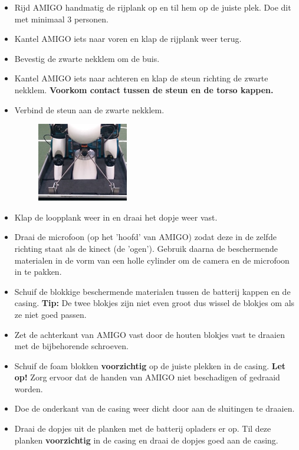\documentclass[a4paper,10pt]{article}
\numberwithin{equation}{section}
\numberwithin{figure}{section}
\numberwithin{table}{section}
\begin{document}
\begin{itemize}
\begin{itemize}
		\item Rijd AMIGO handmatig de rijplank op en til hem op de juiste plek. Doe dit met minimaal $3$ personen.
        \item Kantel AMIGO iets naar voren en klap de rijplank weer terug.
        \item Bevestig de zwarte nekklem om de buis.
        \item Kantel AMIGO iets naar achteren en klap de steun richting de zwarte nekklem. \textbf{Voorkom contact tussen de steun en de torso kappen.}
		\item Verbind de steun aan de zwarte nekklem.
		\begin{figure}[H]
			\centering
			\includegraphics[scale = 0.8]{Figures/klem}
		\end{figure}
		\item Klap de loopplank weer in en draai het dopje weer vast.
		\item Draai de microfoon (op het 'hoofd' van AMIGO) zodat deze in de zelfde richting staat als de kinect (de 'ogen'). Gebruik daarna de beschermende materialen in de vorm van een holle cylinder om de camera en de microfoon in te pakken.
		\item Schuif de blokkige beschermende materialen tussen de batterij kappen en de casing. \textbf{Tip:} De twee blokjes zijn niet even groot dus wissel de blokjes om als ze niet goed passen.
		\item Zet de achterkant van AMIGO vast door de houten blokjes vast te draaien met de bijbehorende schroeven.
		\item Schuif de foam blokken \textbf{voorzichtig} op de juiste plekken in de casing. \textbf{Let op!} Zorg ervoor dat de handen van AMIGO niet beschadigen of gedraaid worden.
		\item Doe de onderkant van de casing weer dicht door aan de sluitingen te draaien.
		\item Draai de dopjes uit de planken met de batterij opladers er op.
		Til deze planken \textbf{voorzichtig} in de casing en draai de dopjes goed aan de casing.


\end{itemize}
\end{itemize}
\end{document}
